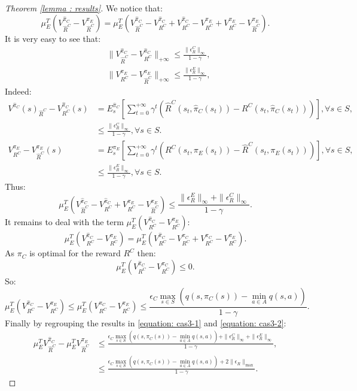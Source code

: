 \documentclass{llncs}
\newcommand{\0}{\mathbf{0}}
\newcommand{\1}{\mathbf{1}}
\begin{document}
\begin{proof}[Theorem \ref{lemma : results}]
We notice that:
\begin{equation}
\mu_E^T(V^{\hat{\pi}_C}_{\hat{R}^C}-V^{\pi_E}_{\hat{R}^C})=\mu_E^T(V^{\hat{\pi}_C}_{\hat{R}^C}-V^{\hat{\pi}_C}_{R^C}+V^{\hat{\pi}_C}_{R^C}-V^{\pi_E}_{R^C}+V^{\pi_E}_{R^C}-V^{\pi_E}_{\hat{R}^C}).
\end{equation}
It is very easy to see that:
\begin{align}
&\|V^{\hat{\pi}_C}_{\hat{R}^C}-V^{\hat{\pi}_C}_{R^C}\|_{+\infty}\leq\frac{\|\epsilon^C_R\|_{\infty}}{1-\gamma},
\\
&\|V^{\pi_E}_{R^C}-V^{\pi_E}_{\hat{R}^C}\|_{+\infty}\leq\frac{\|\epsilon^E_R\|_{\infty}}{1-\gamma},
\end{align}
Indeed:
\begin{align}
V^{\hat{\pi}_C}(s)_{\hat{R}^C}-V^{\hat{\pi}_C}_{R^C}(s)&=E^{\hat{\pi}_C}_s[\sum_{t=0}^{+\infty}\gamma^t(\hat{R}^C(s_t,\hat{\pi}_C(s_t))-R^C(s_t,\hat{\pi}_C(s_t)))], \forall s\in S,
\\
&\leq\frac{\|\epsilon^C_R\|_{\infty}}{1-\gamma}, \forall s\in S.
\\
V^{\pi_E}_{R^C}-V^{\pi_E}_{\hat{R}^C}(s)&=E^{\pi_E}_s[\sum_{t=0}^{+\infty}\gamma^t(R^C(s_t,\pi_E(s_t))-\hat{R}^C(s_t,\pi_E(s_t)))], \forall s\in S,
\\
&\leq\frac{\|\epsilon^E_R\|_{\infty}}{1-\gamma}, \forall s\in S.
\end{align}
Thus:
\begin{equation}
\label{equation: cas3-1}
\mu_E^T(V^{\hat{\pi}_C}_{\hat{R}^C}-V^{\hat{\pi}_C}_{R^C}+V^{\pi_E}_{R^C}-V^{\pi_E}_{\hat{R}^C})\leq\frac{\|\epsilon^E_R\|_{\infty}+\|\epsilon^C_R\|_{\infty}}{1-\gamma}.
\end{equation}
It remains to deal with the term $\mu_E^T(V^{\hat{\pi}_C}_{R^C}-V^{\pi_E}_{R^C})$:
\begin{equation}
\mu_E^T(V^{\hat{\pi}_C}_{R^C}-V^{\pi_E}_{R^C})=\mu_E^T(V^{\hat{\pi}_C}_{R^C}-V^{\pi_C}_{R^C}+V^{\pi_C}_{R^C}-V^{\pi_E}_{R^C}).
\end{equation}
As $\pi_C$ is optimal for the reward $R^C$ then:
\begin{equation}
\mu_E^T(V^{\hat{\pi}_C}_{R^C}-V^{\pi_C}_{R^C})\leq 0.
\end{equation}
So:
\begin{equation}
\label{equation: cas3-2}
\mu_E^T(V^{\hat{\pi}_C}_{R^C}-V^{\pi_E}_{R^C})\leq \mu_E^T(V^{\pi_C}_{R^C}-V^{\pi_E}_{R^C})\leq \frac{\epsilon_C\max_{s\in S}(q(s,\pi_C(s))-\min_{a\in A}q(s,a))}{1-\gamma}.
\end{equation}
Finally by regrouping the results in \eqref{equation: cas3-1} and \eqref{equation: cas3-2}:
\begin{align}
\mu_E^TV^{\hat{\pi}_C}_{\hat{R}^C}-\mu_E^TV^{\pi_E}_{\hat{R}^C}&\leq \frac{\epsilon_C\max_{s\in S}(q(s,\pi_C(s))-\min_{a\in A}q(s,a))+\|\epsilon^C_R\|_{\infty}+\|\epsilon^E_R\|_{\infty}}{1-\gamma},
\\
&\leq\frac{\epsilon_C\max_{s\in S}(q(s,\pi_C(s))-\min_{a\in A}q(s,a))+2\|\epsilon_R\|_{\text{max}}}{1-\gamma}.
\end{align}

\end{proof}
\end{document}

